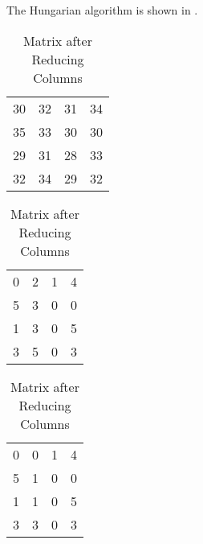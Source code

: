 % 
%
%

\begin{subquestions}
	
\subquestion
	
\begin{subsubquestions}
		
\subsubquestion
		
The Hungarian algorithm is shown in .
		\begin{table}[!hbt]
			\begin{minipage}{0.3\textwidth}
				\centering
				\begin{tabular}{cccc}
					30 & 32 & 31 & 34 \\
					35 & 33 & 30 & 30 \\
					29 & 31 & 28 & 33 \\
					32 & 34 & 29 & 32 \\
				\end{tabular}
				\captionsetup{width=1.1\linewidth}
				\caption*{Matrix From question}
			\end{minipage}
			\hspace{20pt}
			\begin{minipage}{0.3\textwidth}
				\centering
				\begin{tabular}{cccc}
					0 & 2 & 1 & 4 \\
					5 & 3 & 0 & 0 \\
					1 & 3 & 0 & 5 \\
					3 & 5 & 0 & 3 \\
				\end{tabular}
				\captionsetup{width=1.1\linewidth}
				\caption*{Matrix after Reducing Rows}
			\end{minipage}
			\hspace{20pt}
			\begin{minipage}{0.3\textwidth}
				\centering
				\begin{tabular}{cccc}
					0 & 0 & 1 & 4 \\
					5 & 1 & 0 & 0 \\
					1 & 1 & 0 & 5 \\
					3 & 3 & 0 & 3 \\
				\end{tabular}
				\captionsetup{width=1.1\linewidth}
				\caption*{Matrix after Reducing Columns} 
			\end{minipage}
			

\end{table}
\end{subsubquestions}
\end{subquestions}
